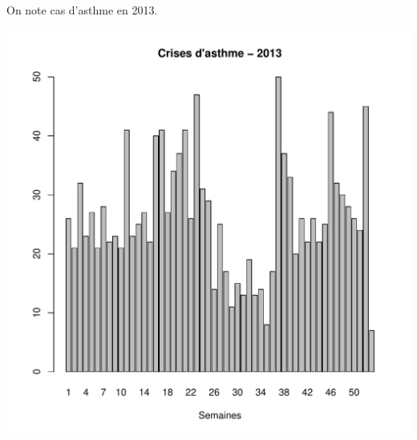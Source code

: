 \documentclass[12pt,english,french,twoside]{book}\usepackage[]{graphicx}\usepackage[]{color}
\makeatletter
\def\maxwidth{ %
  \ifdim\Gin@nat@width>\linewidth
    \linewidth
  \else
    \Gin@nat@width
  \fi
}
\makeatother
\begin{document}
On note  cas d'asthme en 2013.


\includegraphics[width=\maxwidth]{figure/asthme2-1} 
\end{document}
